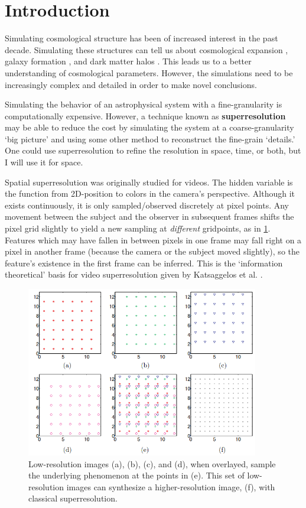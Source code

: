 \section*{Introduction}

Simulating cosmological structure has been of increased interest in the past decade. Simulating these structures can tell us about cosmological expansion \cite{cosmological-expansion-application}, galaxy formation \cite{galaxy-formation-application}, and dark matter halos \cite{dark-matter-application}. This leads us to a better understanding of cosmological parameters. However, the simulations need to be increasingly complex and detailed in order to make novel conclusions.

Simulating the behavior of an astrophysical system with a fine-granularity is computationally expensive. However, a technique known as \textbf{superresolution} may be able to reduce the cost by simulating the system at a coarse-granularity `big picture' and using some other method to reconstruct the fine-grain `details.' One could use superresolution to refine the resolution in space, time, or both, but I will use it for space.

Spatial superresolution was originally studied for videos. The hidden variable is the function from 2D-position to colors in the camera's perspective. Although it exists continuously, it is only sampled/observed discretely at pixel points.
Any movement between the subject and the observer in subsequent frames shifts the pixel grid slightly to yield a new sampling at \textit{different} gridpoints, as in \cref{classical-superresolution}.
Features which may have fallen in between pixels in one frame may fall right on a pixel in another frame (because the camera or the subject moved slightly), so the feature's existence in the first frame can be inferred.
This is the `information theoretical' basis for video superresolution given by Katsaggelos et al. \cite{synthesis-lecture}.

\begin{figure}[h!]
  \includegraphics[width=4in]{classical-superresolution.png}
  \caption{Low-resolution images (a), (b), (c), and (d), when overlayed, sample the underlying phenomenon at the points in (e). This set of low-resolution images can synthesize a higher-resolution image, (f), with classical superresolution.}
  \label{classical-superresolution}
\end{figure}

